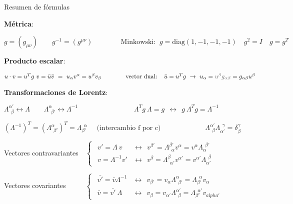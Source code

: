 \begin{myexampleblock}{Resumen de fórmulas}

\textbf{Métrica}:

\vspace{2mm}$g=(g_{\mu \nu}) \qquad g^{-1}=(g^{\mu \nu}) \qquad \qquad \text{Minkowski: } \ g=\text{diag}(1,-1,-1,-1) \quad g^2=I \quad g=g^T$

\vspace{5mm}\textbf{Producto escalar}:

\vspace{2mm} $u\cdot v = u^Tg\ v=\bar u \bar v \ = \ u_\alpha v^\alpha = u^\beta v_\beta \qquad \qquad \text{vector dual: } \ \ \bar u = u^T g \ \to \ u_\alpha=\textcolor{gris}{u^\beta g_{\alpha \beta}}=g_{\alpha \beta} u^\beta$

\vspace{5mm} \textbf{Transformaciones de Lorentz}:

\vspace{2mm} $\Lambda^{\alpha'}_{\ \ \beta} \leftrightarrow \Lambda \quad  \quad \Lambda^\alpha_{\ \ \beta'} \leftrightarrow \Lambda^{-1} \qquad \qquad \qquad \qquad \Lambda^T g \ \Lambda = g \ \ \leftrightarrow \ \ g\ \Lambda^T g = \Lambda^{-1}$

\vspace{2mm} $(\Lambda^{-1})^T =(\Lambda^\alpha_{\ \ \beta'})^T=\Lambda_{\beta'}^{\ \ \alpha}\quad \text{ (intercambio f por c) } \qquad \qquad\qquad \Lambda^{\alpha'}_{\ \ \beta} \Lambda_{\alpha'}^{\ \ \gamma} = \delta_\beta^\gamma$

\vspace{2mm} Vectores contravariantes$ \quad \begin{cases}
\ \ v'=\Lambda \ v &\leftrightarrow \ \ v^{\beta'}=\Lambda^{\beta'}_{\ \ \alpha}v^\alpha = v^\alpha \Lambda_\alpha^{\ \ \beta'} \\
\ \ v=\Lambda^{-1} v' & \leftrightarrow \ \ v^\beta=\Lambda^\beta_{\ \ \alpha'} v^{\alpha'} = v^{\alpha'} \Lambda_{\alpha'}^{\ \ \beta}	
\end{cases}$


\vspace{2mm} Vectores covariantes $ \quad \quad \ \ \begin{cases}
\ \ \bar{v'}=\bar v \Lambda^{-1} &\leftrightarrow \ \ v_{\beta'}=v_\alpha \Lambda^{\alpha}_{\ \ \beta'}=\Lambda_{\beta'}^{\ \ \alpha}v_\alpha \\
\ \ \bar v = \bar{v'} \ \Lambda &\leftrightarrow \ \ v_\beta=v_{\alpha'} \Lambda^{\alpha'}_{\ \ \beta}=\Lambda_{\beta'}^{\ \ \alpha'}v_{alpha'}
\end{cases}$



\end{myexampleblock}
